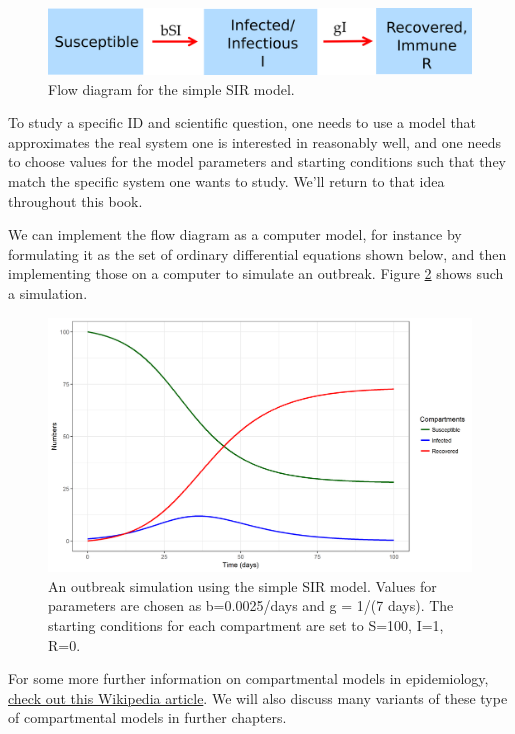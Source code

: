 \documentclass[]{book}
\theoremstyle{definition}
\theoremstyle{definition}
\theoremstyle{definition}
\theoremstyle{remark}
\begin{document}
\begin{figure}
\centering
\includegraphics{./images/basicSIRmodelfigure.png}
\caption{\label{fig:basicSIR}Flow diagram for the simple SIR model.}
\end{figure}

To study a specific ID and scientific question, one needs to use a model
that approximates the real system one is interested in reasonably well,
and one needs to choose values for the model parameters and starting
conditions such that they match the specific system one wants to study.
We'll return to that idea throughout this book.

We can implement the flow diagram as a computer model, for instance by
formulating it as the set of ordinary differential equations shown
below, and then implementing those on a computer to simulate an
outbreak. Figure \ref{fig:sirsim} shows such a simulation.

\begin{figure}
\centering
\includegraphics{./images/sirsim.png}
\caption{\label{fig:sirsim}An outbreak simulation using the simple SIR
model. Values for parameters are chosen as b=0.0025/days and g = 1/(7
days). The starting conditions for each compartment are set to S=100,
I=1, R=0.}
\end{figure}

For some more further information on compartmental models in
epidemiology,
\href{https://en.wikipedia.org/wiki/Compartmental_models_in_epidemiology}{check
out this Wikipedia article}. We will also discuss many variants of these
type of compartmental models in further chapters.
\end{document}
